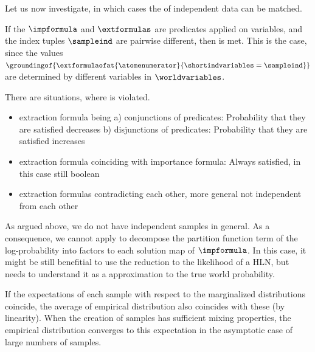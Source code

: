 Let us now investigate, in which cases the  of independent data can be matched.

\begin{example}
    If the $\impformula$ and $\extformulas$ are predicates applied on variables, and the index tuples $\sampleind$ are pairwise different, then  is met.
    This is the case, since the values $\groundingof{\extformulaofat{\atomenumerator}{\shortindvariables=\sampleind}}$ are determined by different variables in $\worldvariables$.
\end{example}



There are situations, where  is violated.
\begin{itemize}
    \item extraction formula being a) conjunctions of predicates: Probability that they are satisfied decreases
    b) disjunctions of predicates: Probability that they are satisfied increases
    \item extraction formula coinciding with importance formula: Always satisfied, in this case still boolean
    \item extraction formulas contradicting each other, more general not independent from each other
\end{itemize}




\begin{remark}
    As argued above, we do not have independent samples in general.
    As a consequence, we cannot apply  to decompose the partition function term of the log-probability into factors to each solution map of $\impformula$.
    In this case, it might be still benefitial to use the reduction to the likelihood of a HLN, but needs to understand it as a approximation to the true world probability.

    If the expectations of each sample with respect to the marginalized distributions coincide, the average of empirical distribution also coincides with these (by linearity).
    When the creation of samples has sufficient mixing properties, the empirical distribution converges to this expectation in the asymptotic case of large numbers of samples.

\end{remark}



